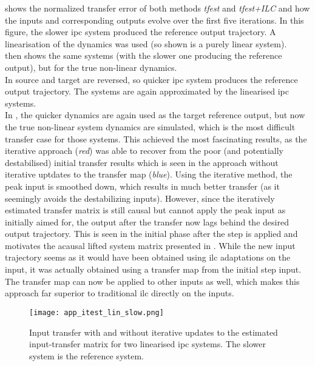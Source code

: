  shows the normalized transfer error of both methods \textit{tfest} and \textit{tfest+ILC} and how the inputs and corresponding outputs evolve over the first five iterations. In this figure, the slower \gls{ipc} system produced the reference output trajectory. A linearisation of the dynamics was used (so shown is a purely linear system).\\
 then shows the same systems (with the slower one producing the reference output), but for the true non-linear dynamics.\\
In  source and target are reversed, so quicker \gls{ipc} system produces the reference output trajectory. The systems are again approximated by the linearised \gls{ipc} systems. \\
In , the quicker dynamics are again used as the target reference output, but now the true non-linear system dynamics are simulated, which is the most difficult transfer case for those systems. This achieved the most fascinating results, as the iterative approach (\textit{red}) was able to recover from the poor (and potentially destabilised) initial transfer results which is seen in the approach without iterative uptdates to the transfer map (\textit{blue}). Using the iterative method, the peak input is smoothed down, which results in much better transfer (as it seemingly avoids the destabilizing inputs). However, since the iteratively estimated transfer matrix is still causal but cannot apply the peak input as initially aimed for, the output after the transfer now lags behind the desired output trajectory. This is seen in the initial phase after the step is applied and motivates the acausal lifted system matrix presented in . While the new input trajectory seems as it would have been obtained using \gls{ilc} adaptations on the input, it was actually obtained using a transfer map from the initial step input. The transfer map can now be applied to other inputs as well, which makes this approach far superior to traditional \gls{ilc} directly on the inputs.

\begin{figure}
         \centering
         \texttt{[image: app\_itest\_lin\_slow.png]}
         \caption[Iterative Estimation -- Linear Systems and Slow Reference]{Input transfer with and without iterative updates to the estimated input-transfer matrix for two linearised \acrshort{ipc} systems. The slower system is the reference system.}
         \label{fig:app_itest_lin_slow}
 \end{figure} 
 
